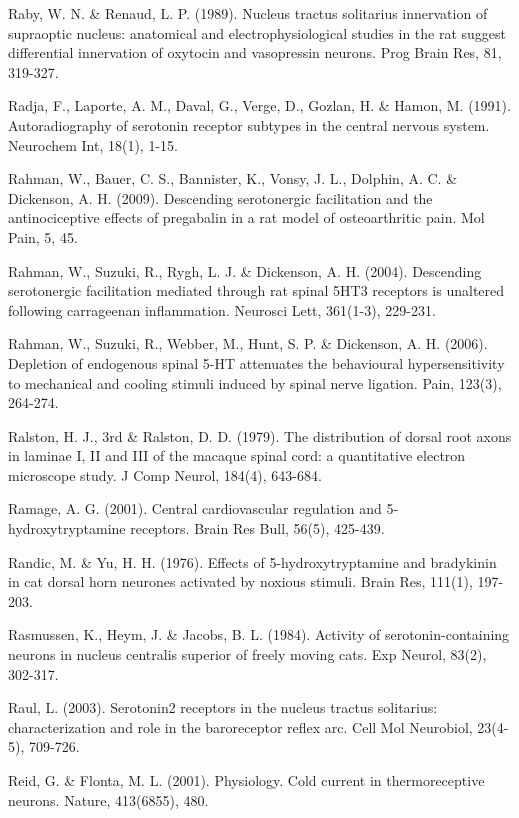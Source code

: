 \documentclass[a4paper,12pt,twoside]{report}
\begin{document}
\begin{singlespacing}
\begin{footnotesize}
Raby, W. N. \& Renaud, L. P. (1989). Nucleus tractus solitarius innervation of supraoptic nucleus: anatomical and electrophysiological studies in the rat suggest differential innervation of oxytocin and vasopressin neurons. Prog Brain Res, 81, 319-327.

Radja, F., Laporte, A. M., Daval, G., Verge, D., Gozlan, H. \& Hamon, M. (1991). Autoradiography of serotonin receptor subtypes in the central nervous system. Neurochem Int, 18(1), 1-15.

Rahman, W., Bauer, C. S., Bannister, K., Vonsy, J. L., Dolphin, A. C. \& Dickenson, A. H. (2009). Descending serotonergic facilitation and the antinociceptive effects of pregabalin in a rat model of osteoarthritic pain. Mol Pain, 5, 45.

Rahman, W., Suzuki, R., Rygh, L. J. \& Dickenson, A. H. (2004). Descending serotonergic facilitation mediated through rat spinal 5HT3 receptors is unaltered following carrageenan inflammation. Neurosci Lett, 361(1-3), 229-231.

Rahman, W., Suzuki, R., Webber, M., Hunt, S. P. \& Dickenson, A. H. (2006). Depletion of endogenous spinal 5-HT attenuates the behavioural hypersensitivity to mechanical and cooling stimuli induced by spinal nerve ligation. Pain, 123(3), 264-274.

Ralston, H. J., 3rd \& Ralston, D. D. (1979). The distribution of dorsal root axons in laminae I, II and III of the macaque spinal cord: a quantitative electron microscope study. J Comp Neurol, 184(4), 643-684.

Ramage, A. G. (2001). Central cardiovascular regulation and 5-hydroxytryptamine receptors. Brain Res Bull, 56(5), 425-439.

Randic, M. \& Yu, H. H. (1976). Effects of 5-hydroxy\linebreak tryptamine and bradykinin in cat dorsal horn neurones activated by noxious stimuli. Brain Res, 111(1), 197-203.

Rasmussen, K., Heym, J. \& Jacobs, B. L. (1984). Activity of serotonin-containing neurons in nucleus centralis superior of freely moving cats. Exp Neurol, 83(2), 302-317.

Raul, L. (2003). Serotonin2 receptors in the nucleus tractus solitarius: characterization and role in the baroreceptor reflex arc. Cell Mol Neurobiol, 23(4-5), 709-726.

Reid, G. \& Flonta, M. L. (2001). Physiology. Cold current in thermoreceptive neurons. Nature, 413(6855), 480.


\end{footnotesize}
\end{singlespacing}
\end{document}
